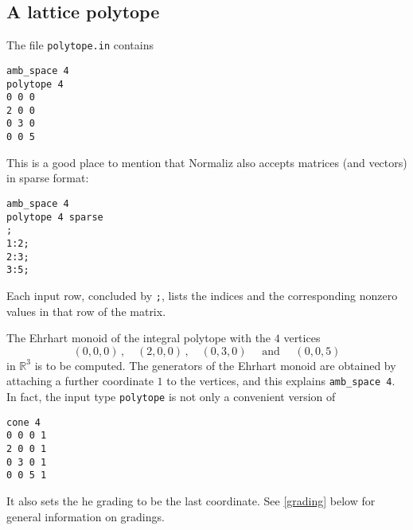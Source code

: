\documentclass[12pt,a4paper]{scrartcl}
\theoremstyle{definition}
\def\RR{{\mathbb R}}
\def\ttt{\texttt}
\begin{document}
\subsection{A lattice polytope}\label{lattice_polytope}\label{polytope_ex}

\begin{minipage}[b]{0.5\textwidth}
The file \ttt{polytope.in} contains

\begin{Verbatim}
amb_space 4
polytope 4
0 0 0
2 0 0
0 3 0
0 0 5
\end{Verbatim}
\end{minipage}
\hspace{1cm}
\begin{minipage}[t]{0.4\textwidth}
\end{minipage}

This is a good place to mention that Normaliz also accepts matrices (and vectors) in sparse format:

\begin{Verbatim}
amb_space 4
polytope 4 sparse
;
1:2;
2:3;
3:5;
\end{Verbatim}
Each input row, concluded by \verb|;|, lists the indices and the corresponding nonzero values in that row of the matrix.

The Ehrhart monoid of the integral polytope with the $4$
vertices
$$
(0,0,0)\,,\quad (2,0,0)\,,\quad (0,3,0)\quad\text{ and }\quad (0,0,5)
$$
in $\RR^3$ is to be computed. The generators of the Ehrhart monoid are obtained by attaching a further coordinate $1$ to the vertices, and this explains \verb|amb_space 4|. In fact, the input type \verb|polytope| is not only a convenient version of
\begin{Verbatim}
cone 4
0 0 0 1
2 0 0 1
0 3 0 1
0 0 5 1
\end{Verbatim}
It also sets the he grading to be the last coordinate. See \ref{grading} below for general information on gradings.
\end{document}
